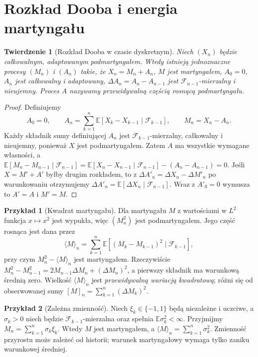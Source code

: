 \documentclass[11pt,a4paper,oneside]{report}
\numberwithin{equation}{chapter}
\theoremstyle{plain}
\newtheorem{twierdzenie}{Twierdzenie}[chapter]
\theoremstyle{definition}
\newtheorem{przyklad}{Przykład}[chapter]
\theoremstyle{remark}
\newcommand{\E}{\mathbb{E}}
\begin{document}
\section{Rozkład Dooba i energia martyngału}

\begin{twierdzenie}[Rozkład Dooba w czasie dyskretnym]
Niech $(X_n)$ będzie całkowalnym, adaptowanym
podmartyngałem. Wtedy istnieją jednoznaczne procesy
$(M_n)$ i $(A_n)$ takie, że
$X_n=M_n+A_n$, $M$ jest martyngałem,
$A_0=0$, $A_n$ jest całkowalny i adaptowany,
$\Delta A_n=A_n-A_{n-1}$ jest
$\mathcal F_{n-1}$-mierzalny i nieujemny.
Proces $A$ nazywamy przewidywalną częścią
rosnącą podmartyngału.
\end{twierdzenie}
\begin{proof}
Definiujemy
\[
A_0=0,\qquad
A_n=\sum_{k=1}^n\E[X_k-X_{k-1}\mid\mathcal F_{k-1}],
\qquad M_n=X_n-A_n.
\]
Każdy składnik sumy definiującej $A_n$ jest
$\mathcal F_{k-1}$-mierzalny, całkowalny i
nieujemny, ponieważ $X$ jest podmartyngałem.
Zatem $A$ ma wszystkie wymagane własności,
a
$\E[M_n-M_{n-1}\mid\mathcal F_{n-1}]
=\E[X_n-X_{n-1}\mid\mathcal F_{n-1}]
-(A_n-A_{n-1})=0$.
Jeśli $X=M'+A'$ byłby drugim rozkładem,
to z $\Delta A'_n=\Delta X_n-\Delta M'_n$
po warunkowaniu otrzymujemy
$\Delta A'_n=\E[\Delta X_n\mid\mathcal F_{n-1}]$.
Wraz z $A'_0=0$ wymusza to $A'=A$ i $M'=M$.
\end{proof}

\begin{przyklad}[Kwadrat martyngału]
Dla martyngału $M$ z wartościami w $L^2$ funkcja
$x\mapsto x^2$ jest wypukła, więc
$(M_n^2)$ jest podmartyngałem. Jego część rosnąca
jest dana przez
\[
\langle M\rangle_n
=\sum_{k=1}^n\E[(M_k-M_{k-1})^2\mid\mathcal F_{k-1}],
\]
przy czym $M_n^2-\langle M\rangle_n$ jest
martyngałem. Rzeczywiście
$M_n^2-M_{n-1}^2=2M_{n-1}\Delta M_n+(\Delta M_n)^2$,
a pierwszy składnik ma warunkową średnią zero.
Wielkość $\langle M\rangle_n$ jest
\emph{przewidywalną wariacją kwadratową};
różni się od obserwowanej sumy
$[M]_n=\sum_{k=1}^n(\Delta M_k)^2$.
\end{przyklad}

\begin{przyklad}[Zależna zmienność]
Niech $\xi_k\in\{-1,1\}$ będą niezależne i uczciwe,
a $\sigma_k>0$ niech będzie
$\mathcal F_{k-1}$-mierzalna oraz spełnia
$\E\sigma_k^2<\infty$. Przyjmijmy
$M_n=\sum_{k=1}^n\sigma_k\xi_k$.
Wtedy $M$ jest martyngałem, a
$\langle M\rangle_n=\sum_{k=1}^n\sigma_k^2$.
Zmienność przyrostu może zależeć od historii;
warunek martyngałowy wymaga tylko zaniku
warunkowej średniej.
\end{przyklad}
\end{document}
